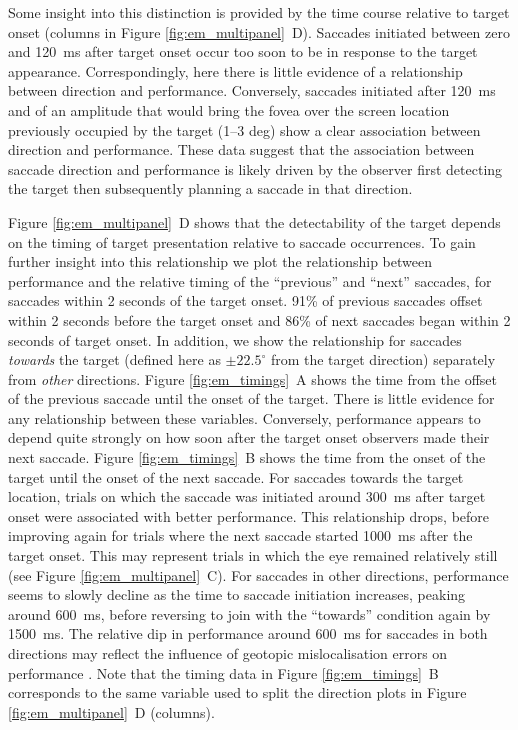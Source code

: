 \documentclass[11pt,a4paper]{article}
\begin{document}
Some insight into this distinction is provided by the time course relative to target onset (columns in Figure \ref{fig:em_multipanel}~D).
Saccades initiated between zero and 120~ms after target onset occur too soon to be in response to the target appearance.
Correspondingly, here there is little evidence of a relationship between direction and performance.
Conversely, saccades initiated after 120~ms and of an amplitude that would bring the fovea over the screen location previously occupied by the target (1--3 deg) show a clear association between direction and performance.
These data suggest that the association between saccade direction and performance is likely driven by the observer first detecting the target then subsequently planning a saccade in that direction.

Figure \ref{fig:em_multipanel}~D shows that the detectability of the target depends on the timing of target presentation relative to saccade occurrences.
To gain further insight into this relationship we plot the relationship between performance and the relative timing of the ``previous'' and ``next'' saccades, for saccades within 2 seconds of the target onset.
91\% of previous saccades offset within 2 seconds before the target onset and 86\% of next saccades began within 2 seconds of target onset.
In addition, we show the relationship for saccades \textit{towards} the target (defined here as $\pm 22.5^\circ$ from the target direction) separately from \textit{other} directions.
Figure \ref{fig:em_timings}~A shows the time from the offset of the previous saccade until the onset of the target.
There is little evidence for any relationship between these variables.
Conversely, performance appears to depend quite strongly on how soon after the target onset observers made their next saccade.
Figure \ref{fig:em_timings}~B shows the time from the onset of the target until the onset of the next saccade.
For saccades towards the target location, trials on which the saccade was initiated around 300~ms after target onset were associated with better performance.
This relationship drops, before improving again for trials where the next saccade started 1000~ms after the target onset.
This may represent trials in which the eye remained relatively still (see Figure \ref{fig:em_multipanel}~C).
For saccades in other directions, performance seems to slowly decline as the time to saccade initiation increases, peaking around 600~ms, before reversing to join with the ``towards'' condition again by 1500~ms.
The relative dip in performance around 600~ms for saccades in both directions may reflect the influence of geotopic mislocalisation errors on performance \citep{Dorr2013}.
Note that the timing data in Figure \ref{fig:em_timings}~B corresponds to the same variable used to split the direction plots in Figure \ref{fig:em_multipanel}~D (columns).
\end{document}
